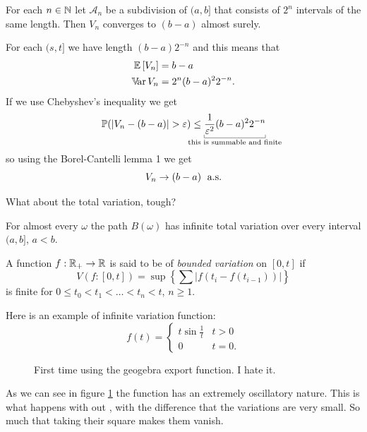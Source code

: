 \documentclass[12pt]{report}
\begin{document}
\begin{theorem}
	For each $n\in\mathbb{N}$ let $\mathcal{A}_{n}$ be a subdivision of $(a,b]$ that consists of $2^{n}$ intervals of the same length. Then $V_{n}$ converges to $(b-a)$ almost surely.
\end{theorem}
\begin{fancyproof}
	For each $(s,t]$ we have length $(b-a)2^{-n}$ and this means that
	\begin{align*}
		\mathbb{E}\left[V_{n}\right]&=b-a\\
		\mathbb{V}\!\mathrm{ar}\, V_{n}&=2^{n}(b-a)^{2}2^{-n}.
	\end{align*}
	If we use Chebyshev's inequality we get
	\begin{equation*}
		\pr(|V_{n}-(b-a)|>\varepsilon)\leq\ubracketthin{\frac{1}{\varepsilon^{2}}(b-a)^{2}2^{-n}}_{\claptext{this is summable and finite}}
	\end{equation*}
	so using the Borel-Cantelli lemma 1 we get
	\begin{equation*}
		V_{n}\to(b-a)\;\text{ a.s.}{}
	\end{equation*}
\end{fancyproof}
What about the total variation, tough?
\begin{proposition}
	For almost every $\omega$ the path $B(\omega)$ has infinite total variation over every interval $(a,b]$, $a<b$.
\end{proposition}
\begin{revise}
	A function $f:\mathbb{R}_{+}\to\mathbb{R}$ is said to be of \emph{bounded variation} on $[0,t]$ if $$V(f:[0,t])=\sup\left\{\sum|f(t_{i}-f(t_{i-1}))|\right\}$$ is finite for $0\leq t_{0}<t_{1}<\ldots<t_{n}<t$, $n\geq 1$.
\end{revise}
Here is an example of infinite variation function: 
\begin{equation*}
	f(t)=\begin{cases}
		t\sin\frac{1}{t}&t>0\\
		0&t=0.
	\end{cases}
\end{equation*}
\begin{figure}[h]
	\centering
	
	\caption{First time using the geogebra export function. I hate it.}
	\label{fig:codio}
\end{figure}
As we can see in figure \ref{fig:codio} the function has an extremely oscillatory nature. This is what happens with out \bwm, with the difference that the variations are very small. So much that taking their square makes them vanish.
\end{document}
